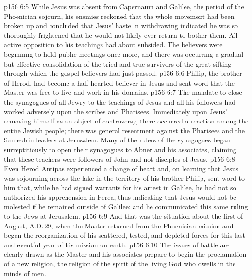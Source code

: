 \vs p156 6:5 \pc While Jesus was absent from Capernaum and Galilee, the period of the Phoenician sojourn, his enemies reckoned that the whole movement had been broken up and concluded that Jesus’ haste in withdrawing indicated he was so thoroughly frightened that he would not likely ever return to bother them. All active opposition to his teachings had about subsided. The believers were beginning to hold public meetings once more, and there was occurring a gradual but effective consolidation of the tried and true survivors of the great sifting through which the gospel believers had just passed.
\vs p156 6:6 Philip, the brother of Herod, had become a half\hyp{}hearted believer in Jesus and sent word that the Master was free to live and work in his domains.
\vs p156 6:7 The mandate to close the synagogues of all Jewry to the teachings of Jesus and all his followers had worked adversely upon the scribes and Pharisees. Immediately upon Jesus’ removing himself as an object of controversy, there occurred a reaction among the entire Jewish people; there was general resentment against the Pharisees and the Sanhedrin leaders at Jerusalem. Many of the rulers of the synagogues began surreptitiously to open their synagogues to Abner and his associates, claiming that these teachers were followers of John and not disciples of Jesus.
\vs p156 6:8 Even Herod Antipas experienced a change of heart and, on learning that Jesus was sojourning across the lake in the territory of his brother Philip, sent word to him that, while he had signed warrants for his arrest in Galilee, he had not so authorized his apprehension in Perea, thus indicating that Jesus would not be molested if he remained outside of Galilee; and he communicated this same ruling to the Jews at Jerusalem.
\vs p156 6:9 And that was the situation about the first of August, A.D.\,29, when the Master returned from the Phoenician mission and began the reorganization of his scattered, tested, and depleted forces for this last and eventful year of his mission on earth.
\vs p156 6:10 The issues of battle are clearly drawn as the Master and his associates prepare to begin the proclamation of a new religion, the religion of the spirit of the living God who dwells in the minds of men.
